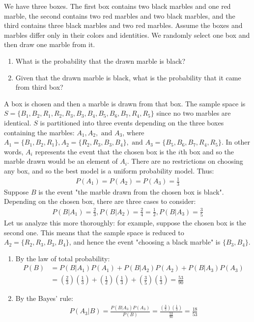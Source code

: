 \begin{exmp}
	We have three boxes.
	The first box contains two black marbles and one red marble,
	the second contains two red marbles and two black marbles,
	and the third contains three black marbles and two red marbles.
	Assume the boxes and marbles differ only in their colors and identities.
	We randomly select one box and then draw one marble from it.
	\begin{enumerate}
		\item What is the probability that the drawn marble is black?
		\item Given that the drawn marble is black, what is the probability that it came from third box?
	\end{enumerate}
\end{exmp}
\begin{solution}
	A box is chosen and then a marble is drawn from that box.
	The sample space is \( S = \{ B_1, B_2, R_1, R_2, R_3, B_3, B_4, B_5, B_6, B_7, R_4, R_5 \} \) since no two marbles are identical.
	\( S \) is partitioned into three events depending on the three boxes containing the marbles:
	\( A_1, A_2, \text{ and } A_3 \), where \( A_1 = \{ B_1, B_2, R_1 \}, A_2 = \{ R_2, R_3, B_3, B_4 \}, \text{ and } A_3 = \{ B_5, B_6, B_7, R_4, R_5 \} \).
	In other words, \( A_i \) represents the event that the chosen box is the \( i \)th box and so the marble drawn would be an element of \( A_i \).
	There are no restrictions on choosing any box, and so the best model is a uniform probability model.
	Thus:
	\begin{gather*}
		P(A_1) = P(A_2) = P(A_3) = \frac{1}{3}
	\end{gather*}
	Suppose \( B \) is the event "the marble drawn from the chosen box is black".
	Depending on the chosen box, there are three cases to consider:
	\begin{gather*}
		P(B | A_1) = \frac{2}{3}, P(B | A_2) = \frac{2}{4} = \frac{1}{2}, P(B | A_3) = \frac{3}{5}
	\end{gather*}
	Let us analyze this more thoroughly:
	for example, suppose the chosen box is the second one.
	This means that the sample space is reduced to \( A_2 = \{ R_2, R_3, B_3, B_4 \} \), and hence the event "choosing a black marble" is \( \{ B_3, B_4 \} \).
	\begin{enumerate}
		\item By the law of total probability:
		\begin{align*}
			P(B) &= P(B | A_1)P(A_1) + P(B | A_2)P(A_2) + P(B | A_3)P(A_3)\\
			&= (\frac{2}{3})(\frac{1}{3}) + (\frac{1}{2})(\frac{1}{3}) + (\frac{3}{5})(\frac{1}{3}) = \frac{53}{90}
		\end{align*}
		\item By the Bayes' rule:
		\begin{align*}
			P(A_3 | B) = \frac{P(B | A_3)P(A_3)}{P(B)} = \frac{(\frac{3}{5})(\frac{1}{3})}{\frac{53}{90}} = \frac{18}{53}
		\end{align*}
	\end{enumerate}
\end{solution}

